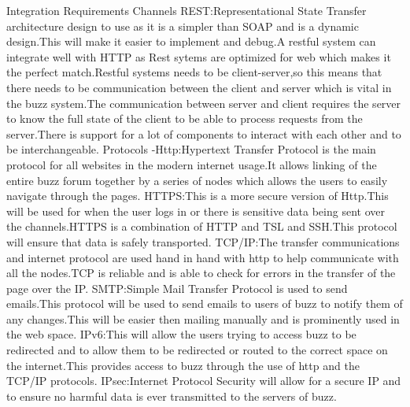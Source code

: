  Integration Requirements
Channels
REST:Representational State Transfer architecture design to use as it is a simpler than SOAP and is a dynamic design.This will make it easier to implement and debug.A restful system can integrate well with HTTP as Rest sytems are optimized for web which makes it the perfect match.Restful systems needs to be client-server,so this means that there needs to be communication between the client and server which is vital in the buzz system.The communication between server and client requires the server to know the full state of the client to be able to process requests from the server.There is support for a lot of components to interact with each other and to be interchangeable.
 Protocols
-Http:Hypertext Transfer Protocol is the main protocol for all websites in the modern internet usage.It allows linking of the entire buzz forum together by a series of nodes which allows the users to easily navigate through the pages.
HTTPS:This is a more secure version of Http.This will be used for when the user logs in or there is sensitive data being sent over the channels.HTTPS is a combination of HTTP and TSL and SSH.This protocol will ensure that data is safely transported.
TCP/IP:The transfer communications and internet protocol are used hand in hand with http to help communicate with all the nodes.TCP is reliable and is able to check for errors in the transfer of the page over the IP.
SMTP:Simple Mail Transfer Protocol is used to send emails.This protocol will be used to send emails to users of buzz to notify them of any changes.This will be easier then mailing manually and is prominently used in the web space.
IPv6:This will allow the users trying to  access buzz to be redirected and to allow them to be redirected or routed to the correct space on the internet.This provides access to buzz through the use of http and the TCP/IP protocols.
IPsec:Internet Protocol Security will allow for a secure IP and to ensure no harmful data is ever transmitted to the servers of buzz.
